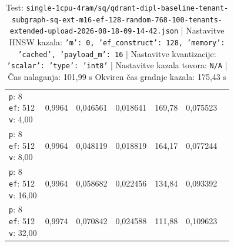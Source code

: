 \begin{table}[htbp]
\begin{tabularx}{\textwidth}{Xrrrrrr}
    \makecell{\texttt{p}: 8\\\texttt{ef}: 512\\\texttt{v}: 4,00} & 0,9964 & 0,046561 & 0,018641 & 169,78 & 0,075523 \\
    \makecell{\texttt{p}: 8\\\texttt{ef}: 512\\\texttt{v}: 8,00} & 0,9964 & 0,048119 & 0,018819 & 164,17 & 0,077244 \\
    \makecell{\texttt{p}: 8\\\texttt{ef}: 512\\\texttt{v}: 16,00} & 0,9964 & 0,058682 & 0,022456 & 134,84 & 0,093392 \\
    \makecell{\texttt{p}: 8\\\texttt{ef}: 512\\\texttt{v}: 32,00} & 0,9974 & 0,070842 & 0,024588 & 111,88 & 0,109623 \\
    \bottomrule
  \end{tabularx}
\caption* {Test: \texttt{single-1cpu-4ram/sq/qdrant-dipl-baseline-tenant-subgraph-sq-ext-m16-ef-128-random-768-100-tenants-extended-upload-2026-08-18-09-14-42.json} | Nastavitve HNSW kazala: \texttt{{'m': 0, 'ef\_construct': 128, 'memory': 'cached', 'payload\_m': 16}} | Nastavitve kvantizacije: \texttt{{'scalar': {'type': 'int8'}}} | Nastavitve kazala tovora: \texttt{N/A} | Čas nalaganja: 101,99 s Okviren čas gradnje kazala: 175,43 s}\end{table}


